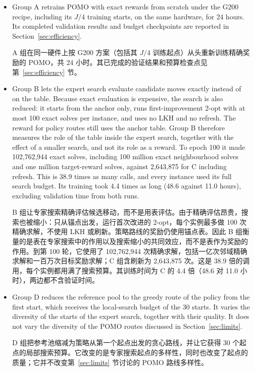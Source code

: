 \documentclass[preprint,12pt,authoryear]{elsarticle}
\newcommand{\zhitem}[1]{\par{\color{zhc}#1}}
\begin{document}
\begin{itemize}
\item Group A retrains POMO with exact rewards from scratch under the G200 recipe, including its $J/4$ training starts, on the same hardware, for 24 hours. Its completed validation results and budget checkpoints are reported in Section~\ref{sec:efficiency}. \zhitem{A 组在同一硬件上按 G200 方案（包括其 $J/4$ 训练起点）从头重新训练精确奖励的 POMO，共 24 小时。其已完成的验证结果和预算检查点见第~\ref{sec:efficiency} 节。}
\item Group B lets the expert search evaluate candidate moves exactly instead of on the table. Because exact evaluation is expensive, the search is also reduced: it starts from the anchor only, runs first-improvement 2-opt with at most 100 exact solves per instance, and uses no LKH and no refresh. The reward for policy routes still uses the anchor table. Group B therefore measures the role of the table inside the expert search, together with the effect of a smaller search, and not its role as a reward. To epoch 100 it made 102,762,944 exact solves, including 100 million exact neighbourhood solves and one million target-reward solves, against 2,643,875 for C including refresh. This is 38.9 times as many calls, and every instance used its full search budget. Its training took 4.4 times as long (48.6 against 11.0 hours), excluding validation time from both runs. \zhitem{B 组让专家搜索精确评估候选移动，而不是用表评估。由于精确评估昂贵，搜索也被缩小：只从锚点出发，运行首次改进的 2-opt，每个实例最多做 100 次精确求解，不使用 LKH 或刷新。策略路线的奖励仍使用锚点表。因此 B 组衡量的是表在专家搜索中的作用以及搜索缩小的共同效应，而不是表作为奖励的作用。到第 100 轮，它使用了 102,762,944 次精确求解，包括一亿次邻域精确求解和一百万次目标奖励求解；C 组含刷新为 2,643,875 次。这是 38.9 倍的调用，每个实例都用满了搜索预算。其训练时间为 C 的 4.4 倍（48.6 对 11.0 小时），两边都不含验证时间。}
\item Group D reduces the reference pool to the greedy route of the policy from the first start, which receives the local-search budget of the 30 starts. It varies the diversity of the starts of the expert search, together with their quality. It does not vary the diversity of the POMO routes discussed in Section~\ref{sec:limits}. \zhitem{D 组把参考池缩减为策略从第一个起点出发的贪心路线，并让它获得 30 个起点的局部搜索预算。它改变的是专家搜索起点的多样性，同时也改变了起点的质量；它并不改变第~\ref{sec:limits} 节讨论的 POMO 路线多样性。}
\end{itemize}
\end{document}
